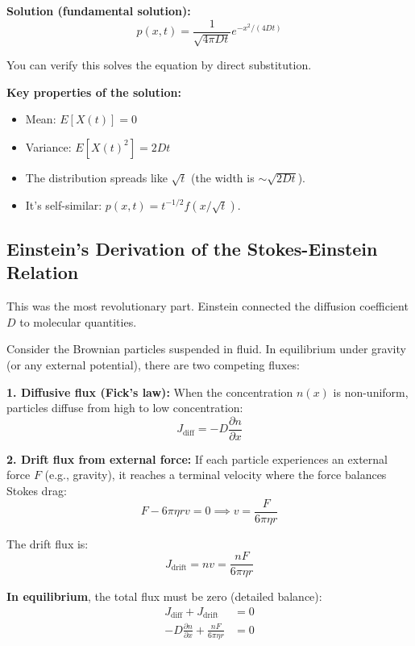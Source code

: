 \documentclass[11pt,a4paper]{article}
\begin{document}
	\textbf{Solution (fundamental solution):}
	\begin{equation}
		p(x,t) = \frac{1}{\sqrt{4\pi D t}} e^{-x^2 / (4Dt)}
	\end{equation}
	
	You can verify this solves the equation by direct substitution.
	
	\textbf{Key properties of the solution:}
	\begin{itemize}
		\item Mean: $E[X(t)] = 0$
		\item Variance: $E[X(t)^2] = 2Dt$
		\item The distribution spreads like $\sqrt{t}$ (the width is $\sim \sqrt{2Dt}$).
		\item It's self-similar: $p(x,t) = t^{-1/2} f(x / \sqrt{t})$.
	\end{itemize}
	
	\subsection{Einstein's Derivation of the Stokes-Einstein Relation}
	
	This was the most revolutionary part. Einstein connected the diffusion coefficient $D$ to molecular quantities.
	
	Consider the Brownian particles suspended in fluid. In equilibrium under gravity (or any external potential), there are two competing fluxes:
	
	\textbf{1. Diffusive flux (Fick's law):}
	When the concentration $n(x)$ is non-uniform, particles diffuse from high to low concentration:
	\begin{equation}
		J_{\text{diff}} = -D \frac{\partial n}{\partial x}
	\end{equation}
	
	\textbf{2. Drift flux from external force:}
	If each particle experiences an external force $F$ (e.g., gravity), it reaches a terminal velocity where the force balances Stokes drag:
	\begin{equation}
		F - 6\pi \eta r v = 0 \implies v = \frac{F}{6\pi \eta r}
	\end{equation}
	
	The drift flux is:
	\begin{equation}
		J_{\text{drift}} = n v = \frac{n F}{6\pi \eta r}
	\end{equation}
	
	\textbf{In equilibrium}, the total flux must be zero (detailed balance):
	\begin{align}
		J_{\text{diff}} + J_{\text{drift}} &= 0 \\
		-D \frac{\partial n}{\partial x} + \frac{n F}{6\pi \eta r} &= 0
	\end{align}
	
\end{document}

